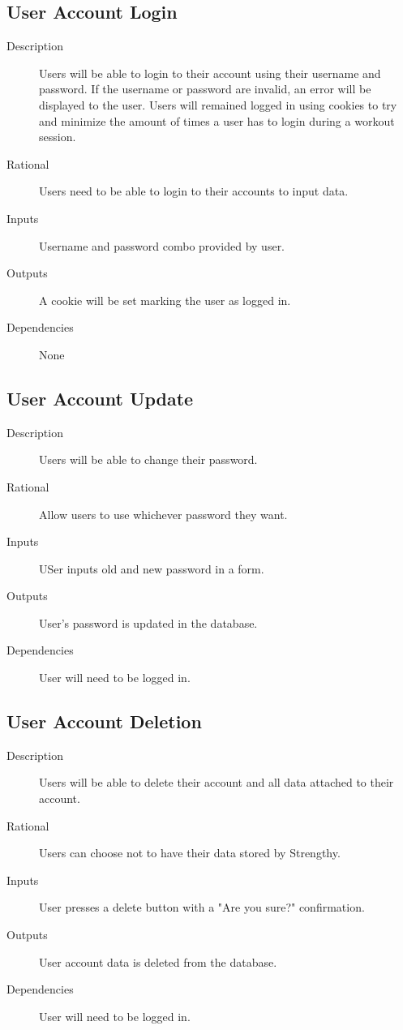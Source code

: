 \documentclass[12pt]{article}
\begin{document}
\subsection{User Account Login}
\begin{description}
	\item[Description] Users will be able to login to their account using their username and password. If the username or password are invalid, an error will be displayed to the user. Users will remained logged in using cookies to try and minimize the amount of times a user has to login during a workout session.
	\item[Rational] Users need to be able to login to their accounts to input data.
	\item[Inputs] Username and password combo provided by user.
	\item[Outputs] A cookie will be set marking the user as logged in.
	\item[Dependencies] None
\end{description}

\subsection{User Account Update}
\begin{description}
	\item[Description] Users will be able to change their password.
	\item[Rational] Allow users to use whichever password they want.
	\item[Inputs] USer inputs old and new password in a form.
	\item[Outputs] User's password is updated in the database.
	\item[Dependencies] User will need to be logged in. 
\end{description}

\subsection{User Account Deletion}
\begin{description}
	\item[Description] Users will be able to delete their account and all data attached to their account. 
	\item[Rational] Users can choose not to have their data stored by Strengthy.
	\item[Inputs] User presses a delete button with a "Are you sure?" confirmation.
	\item[Outputs] User account data is deleted from the database.
	\item[Dependencies] User will need to be logged in. 
\end{description}
\end{document}
